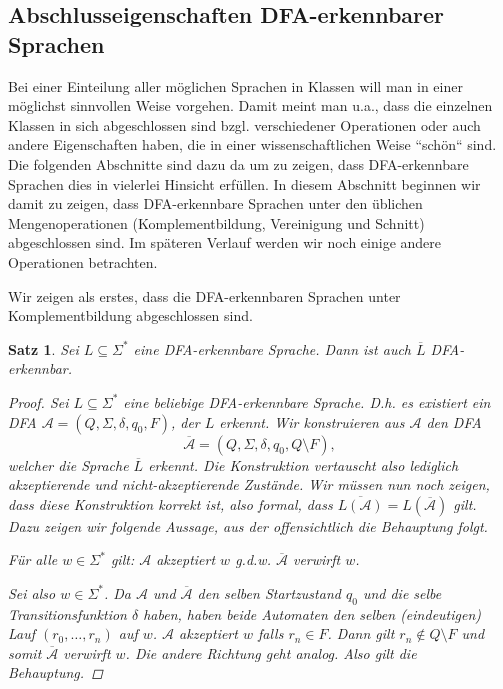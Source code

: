 \documentclass[11pt, a4paper]{article}
\theoremstyle{definition}
\theoremstyle{plain}
\newtheorem{theorem}[definition]{Satz}
\numberwithin{equation}{section}
\newcommand{\comp}[1]{\overline{#1}}
\begin{document}
\subsection{Abschlusseigenschaften DFA-erkennbarer Sprachen}\label{sec:regular_closure}
Bei einer Einteilung aller möglichen Sprachen in Klassen will man in einer möglichst sinnvollen Weise vorgehen. Damit meint man u.a., dass die einzelnen Klassen in sich abgeschlossen sind bzgl. verschiedener Operationen oder auch andere Eigenschaften haben, die in einer wissenschaftlichen Weise ``schön`` sind. Die folgenden Abschnitte sind dazu da um zu zeigen, dass DFA-erkennbare Sprachen dies in vielerlei Hinsicht erfüllen. In diesem Abschnitt beginnen wir damit zu zeigen, dass DFA-erkennbare Sprachen unter den üblichen Mengenoperationen (Komplementbildung, Vereinigung und Schnitt) abgeschlossen sind. Im späteren Verlauf werden wir noch einige andere Operationen betrachten.\par
Wir zeigen als erstes, dass die DFA-erkennbaren Sprachen unter Komplementbildung abgeschlossen sind.
\begin{theorem}\label{thm:regular_complement}
	Sei $L \subseteq \Sigma^\ast$ eine DFA-erkennbare Sprache. Dann ist auch $\comp{L}$ DFA-erkennbar.
	\begin{proof}
		Sei $L \subseteq \Sigma^\ast$ eine beliebige DFA-erkennbare Sprache. D.h. es existiert ein DFA $\mathcal{A} = (Q, \Sigma, \delta, q_0, F)$, der $L$ erkennt. Wir konstruieren aus $\mathcal{A}$ den DFA
		$$
			\comp{\mathcal{A}} = (Q, \Sigma, \delta, q_0, Q \setminus F),
		$$
		welcher die Sprache $\comp{L}$ erkennt. Die Konstruktion vertauscht also lediglich akzeptierende und nicht-akzeptierende Zustände. Wir müssen nun noch zeigen, dass diese Konstruktion korrekt ist, also formal, dass $\comp{L(\mathcal{A})} = L(\comp{\mathcal{A}})$ gilt. Dazu zeigen wir folgende Aussage, aus der offensichtlich die Behauptung folgt.
		\begin{center}
			Für alle $w \in \Sigma^\ast$ gilt: $\mathcal{A}$ akzeptiert $w$ {g.d.w.} $\comp{\mathcal{A}}$ verwirft $w$.
		\end{center}
		Sei also $w \in \Sigma^\ast$. Da $\mathcal{A}$ und $\comp{\mathcal{A}}$ den selben Startzustand $q_0$ und die selbe Transitionsfunktion $\delta$ haben, haben beide Automaten den selben (eindeutigen) Lauf $(r_0, \ldots, r_n)$ auf $w$. $\mathcal{A}$ akzeptiert $w$ falls $r_n \in F$. Dann gilt $r_n \notin Q \setminus F$ und somit $\comp{\mathcal{A}}$ verwirft $w$. Die andere Richtung geht analog. Also gilt die Behauptung.
	\end{proof}
\end{theorem}
\end{document}

